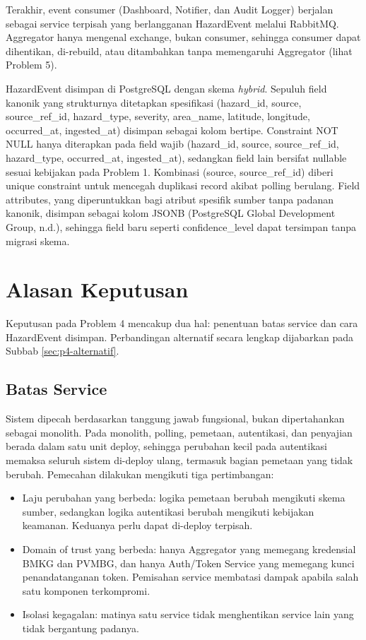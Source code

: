 Terakhir, event consumer (Dashboard, Notifier, dan Audit Logger) berjalan sebagai service terpisah yang berlangganan HazardEvent melalui RabbitMQ. Aggregator hanya mengenal exchange, bukan consumer, sehingga consumer dapat dihentikan, di-rebuild, atau ditambahkan tanpa memengaruhi Aggregator (lihat Problem 5).

HazardEvent disimpan di PostgreSQL dengan skema \emph{hybrid}. Sepuluh field kanonik yang strukturnya ditetapkan spesifikasi (hazard\_id, source, source\_ref\_id, hazard\_type, severity, area\_name, latitude, longitude, occurred\_at, ingested\_at) disimpan sebagai kolom bertipe. Constraint NOT NULL hanya diterapkan pada field wajib (hazard\_id, source, source\_ref\_id, hazard\_type, occurred\_at, ingested\_at), sedangkan field lain bersifat nullable sesuai kebijakan pada Problem 1. Kombinasi (source, source\_ref\_id) diberi unique constraint untuk mencegah duplikasi record akibat polling berulang. Field attributes, yang diperuntukkan bagi atribut spesifik sumber tanpa padanan kanonik, disimpan sebagai kolom JSONB (PostgreSQL Global Development Group, n.d.), sehingga field baru seperti confidence\_level dapat tersimpan tanpa migrasi skema.

\section{Alasan Keputusan}

Keputusan pada Problem 4 mencakup dua hal: penentuan batas service dan cara HazardEvent disimpan. Perbandingan alternatif secara lengkap dijabarkan pada Subbab \ref{sec:p4-alternatif}.

\subsection{Batas Service}

Sistem dipecah berdasarkan tanggung jawab fungsional, bukan dipertahankan sebagai monolith. Pada monolith, polling, pemetaan, autentikasi, dan penyajian berada dalam satu unit deploy, sehingga perubahan kecil pada autentikasi memaksa seluruh sistem di-deploy ulang, termasuk bagian pemetaan yang tidak berubah. Pemecahan dilakukan mengikuti tiga pertimbangan:

\begin{itemize}
\tightlist
\item
  Laju perubahan yang berbeda: logika pemetaan berubah mengikuti skema sumber, sedangkan logika autentikasi berubah mengikuti kebijakan keamanan. Keduanya perlu dapat di-deploy terpisah.\\
\item
  Domain of trust yang berbeda: hanya Aggregator yang memegang kredensial BMKG dan PVMBG, dan hanya Auth/Token Service yang memegang kunci penandatanganan token. Pemisahan service membatasi dampak apabila salah satu komponen terkompromi.\\
\item
  Isolasi kegagalan: matinya satu service tidak menghentikan service lain yang tidak bergantung padanya.
\end{itemize}

